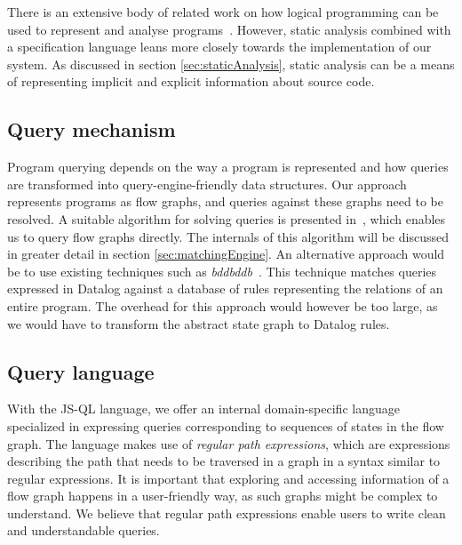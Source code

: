 There is an extensive body of related work on how logical programming can be used to represent and analyse programs~\cite{Reps1995,DatalogDBQueries}. However, static analysis combined with a specification language leans more closely towards the implementation of our system.  As discussed in section \ref{sec:staticAnalysis}, static analysis can be a means of representing implicit and explicit information about source code. 

\subsection*{Query mechanism}

Program querying depends on the way a program is represented and how queries are transformed into query-engine-friendly data structures. Our approach represents programs as flow graphs, and queries against these graphs need to be resolved. A suitable algorithm for solving queries is presented in~\cite{algoEngine}, which enables us to query flow graphs directly. The internals of this algorithm will be discussed in greater detail in section \ref{sec:matchingEngine}. An alternative approach would be to use existing techniques such as \textit{bddbddb}~\cite{bddbddb}. This technique matches queries expressed in Datalog against a database of rules representing the relations of an entire program. The overhead for this approach would however be too large, as we would have to transform the abstract state graph to Datalog rules.

\subsection*{Query language}
With the JS-QL language, we offer an internal domain-specific language specialized in expressing queries corresponding to sequences of states in the flow graph. The language makes use of \textit{regular path expressions}, which are expressions describing the path that needs to be traversed in a graph in a syntax similar to regular expressions. It is important that exploring and accessing information of a flow graph happens in a user-friendly way, as such graphs might be complex to understand. We believe that regular path expressions enable users to write clean and understandable queries. 



